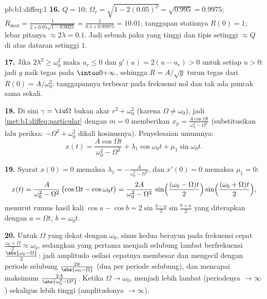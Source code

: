 \begin{solution}{pb:b1:diffeq:1}
\textbf{16.} $Q = 10$; $\Omega_r = \sqrt{1 - 2(0.05)^2} =
\sqrt{0.995} = 0.9975$; $R_{\max} = \frac1{2 \times 0.05
\sqrt{1 - 0.0025}} = \frac1{0.1 \times 0.99875} = 10.01$; tanggapan
statisnya $R(0) = 1$; lebar pitanya $\approx 2\lambda = 0.1$. Jadi sebuah
paku yang tinggi dan tipis setinggi $\approx Q$ di atas dataran setinggi $1$.

\textbf{17.} Jika $2\lambda^2 \geq \omega_0^2$ maka $u_r \leq 0$ dan
$g'(u) = 2(u - u_r) > 0$ untuk setiap $u > 0$: jadi $g$ naik tegas
pada $\intoo0{+\infty}$, sehingga $R = A/\sqrt g$ turun tegas dari
$R(0) = A/\omega_0^2$: tanggapannya terbesar pada frekuensi nol
dan tak ada puncak sama sekali.

\textbf{18.} Di sini $\gamma = \iu\Omega$ bukan akar $r^2 +
\omega_0^2$ (karena $\Omega \neq \omega_0$), jadi
\cref{met:b1:diffeq:particular} dengan $m = 0$ memberikan $x_p =
\frac{A\cos\Omega t}{\omega_0^2 - \Omega^2}$ (substitusikan lalu
periksa: $-\Omega^2 + \omega_0^2$ dikali kosinusnya). Penyelesaian
umumnya:
\[
x(t) = \frac{A\cos\Omega t}{\omega_0^2 - \Omega^2}
+ \lambda_1\cos\omega_0 t + \mu_1\sin\omega_0 t .
\]

\textbf{19.} Syarat $x(0) = 0$ memaksa $\lambda_1 = -\frac A{\omega_0^2 -
\Omega^2}$, dan $x'(0) = 0$ memaksa $\mu_1 = 0$:
\[
x(t) = \frac{A}{\omega_0^2 - \Omega^2}\,
\bigl(\cos\Omega t - \cos\omega_0 t\bigr)
= \frac{2A}{\omega_0^2 - \Omega^2}\,
\sin\Bigl(\frac{(\omega_0 - \Omega)t}2\Bigr)
\sin\Bigl(\frac{(\omega_0 + \Omega)t}2\Bigr) ,
\]
menurut rumus hasil kali $\cos a - \cos b =
2\sin\frac{b - a}2\sin\frac{b + a}2$ yang diterapkan dengan $a = \Omega t$,
$b = \omega_0 t$.

\textbf{20.} Untuk $\Omega$ yang dekat dengan $\omega_0$, sinus kedua
berayun pada frekuensi cepat $\frac{\omega_0 + \Omega}2
\approx \omega_0$, sedangkan yang pertama menjadi selubung lambat berfrekuensi
$\frac{\abs{\omega_0 - \Omega}}2$: jadi amplitudo osilasi
cepatnya membesar dan mengecil dengan periode selubung
$\frac{2\pi}{\abs{\omega_0 - \Omega}}$ (dua  per periode
selubung), dan mencapai maksimum $\frac{2A}{\abs{\omega_0^2 - \Omega^2}}$.
Ketika $\Omega \to \omega_0$,  menjadi lebih lambat (periodenya
$\to \infty$) sekaligus lebih tinggi (amplitudonya $\to \infty$).


\end{solution}

